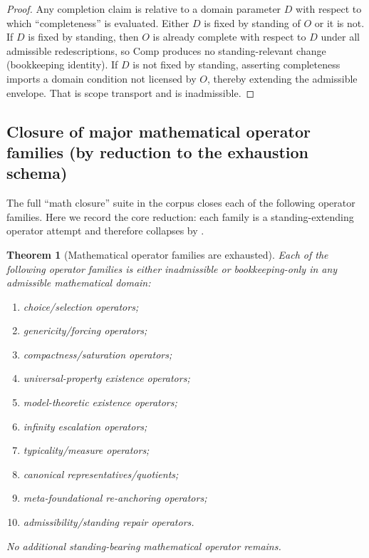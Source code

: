 \documentclass[11pt]{article}
\newtheorem{theorem}{Theorem}[section]
\theoremstyle{definition}
\begin{document}
\begin{proof}
Any completion claim is relative to a domain parameter $D$ with respect to which ``completeness'' is evaluated.
Either $D$ is fixed by standing of $O$ or it is not.
If $D$ is fixed by standing, then $O$ is already complete with respect to $D$ under all admissible redescriptions, so $\mathrm{Comp}$ produces no standing-relevant change (bookkeeping identity).
If $D$ is not fixed by standing, asserting completeness imports a domain condition not licensed by $O$, thereby extending the admissible envelope.
That is scope transport and is inadmissible.
\end{proof}

\subsection{Closure of major mathematical operator families (by reduction to the exhaustion schema)}

The full ``math closure'' suite in the corpus closes each of the following operator families.
Here we record the core reduction: each family is a standing-extending operator attempt and therefore collapses by .

\begin{theorem}[Mathematical operator families are exhausted]
\label{thm:math-exhausted}
Each of the following operator families is either inadmissible or bookkeeping-only in any admissible mathematical domain:
\begin{enumerate}[label=(\alph*), leftmargin=2em]
\item choice/selection operators;
\item genericity/forcing operators;
\item compactness/saturation operators;
\item universal-property existence operators;
\item model-theoretic existence operators;
\item infinity escalation operators;
\item typicality/measure operators;
\item canonical representatives/quotients;
\item meta-foundational re-anchoring operators;
\item admissibility/standing repair operators.
\end{enumerate}
No additional standing-bearing mathematical operator remains.
\end{theorem}
\end{document}
